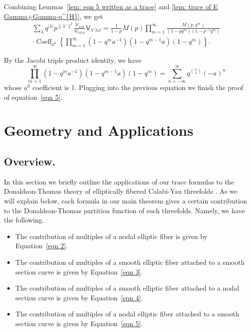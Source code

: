\documentclass[12pt]{amsart}
\newcommand{\Vsf}{\mathsf{V}}
\newcommand{\bx}{\square}
\renewcommand{\emptyset}{\varnothing}
\theoremstyle{definition}
\begin{document}
Combining Lemmas~\ref{lem: eqn 5 written as a trace} and \ref{lem:
trace of E Gamma+Gamma-q^{H}}, we get
\begin{multline*}
\sum_{\lambda} q^{|\lambda |} p^{\| \lambda' \|  ^{2}} \frac{\Vsf_{\lambda
\bx \emptyset}}{\Vsf_{\lambda \emptyset \emptyset}} \Vsf_{\lambda
'\lambda \emptyset} =\frac{1}{1-p} M(p)\prod_{m=1}^{\infty}
\frac{M(p,q^{m})}{(1-pq^{m})(1-p^{-1}q^{m})}\\
 \cdot \operatorname{Coeff}_{a^{0}}\left\{\prod_{m=1}^{\infty}
(1-q^{m}a^{-1})(1-q^{m-1}a)(1-q^{m}) \right\}.
\end{multline*}

By the Jacobi triple product identity, we have
\[
\prod_{m=1}^{\infty} (1-q^{m}a^{-1})(1-q^{m-1}a)(1-q^{m}) =
\sum_{n=-\infty}^{\infty} q^{\binom{n}{2}} (-a)^{n}
\]
whose $a^{0}$ coefficient is 1. Plugging into the previous equation we
finish the proof of equation~\eqref{eqn 5}.

\section{Geometry and Applications}\label{sec: geometry and applications}


\subsection{Overview.} In this section we briefly outline the
applications of our trace formulas to the Donaldson-Thomas theory of
elliptically fibered Calabi-Yau threefolds
\cite{Bryan-K3xE,Bryan-Kool,BOPY}. As we will explain below, each
formula in our main theorem gives a certain contribution to the
Donaldson-Thomas partition function of such threefolds. Namely, we
have the following.
\begin{itemize}
\item The contribution of multiples of a nodal elliptic fiber is given
by Equation~\eqref{eqn 2}.
\item The contribution of multiples of a smooth elliptic fiber
attached to a smooth section curve is given by Equation~\eqref{eqn 3}.
\item The contribution of multiples of a smooth elliptic fiber
attached to a nodal section curve is given by Equation~\eqref{eqn 4}.
\item The contribution of multiples of a nodal elliptic fiber
attached to a smooth section curve is given by Equation~\eqref{eqn 5}.
\end{itemize}
\end{document}
